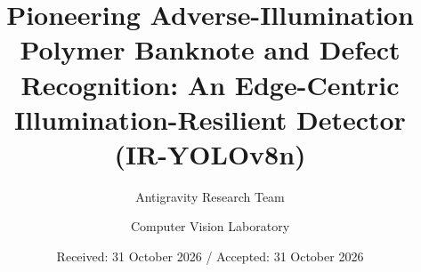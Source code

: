 \documentclass[twocolumn]{svjour3}
\begin{document}
\title{Pioneering Adverse-Illumination Polymer Banknote and Defect Recognition: An Edge-Centric Illumination-Resilient Detector (IR-YOLOv8n)}


\author{Antigravity Research Team \and Computer Vision Laboratory}



\date{Received: 31 October 2026 / Accepted: 31 October 2026}

\maketitle
\end{document}
